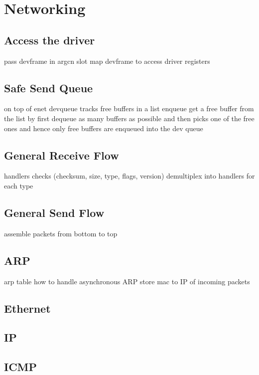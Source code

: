 \section{Networking}

\subsection{Access the driver}

pass devframe in argcn slot
map devframe to access driver registers

\subsection{Safe Send Queue}

on top of enet devqueue
tracks free buffers in a list
enqueue get a free buffer from the list by first dequeue as many buffers as possible and then picks one of the free ones
and hence only free buffers are enqueued into the dev queue

\subsection{General Receive Flow}

handlers
checks (checksum, size, type, flags, version)
demultiplex into handlers for each type

\subsection{General Send Flow}

assemble packets from bottom to top

\subsection{ARP}

arp table
how to handle asynchronous ARP
store mac to IP of incoming packets

\subsection{Ethernet}

\subsection{IP}

\subsection{ICMP}

